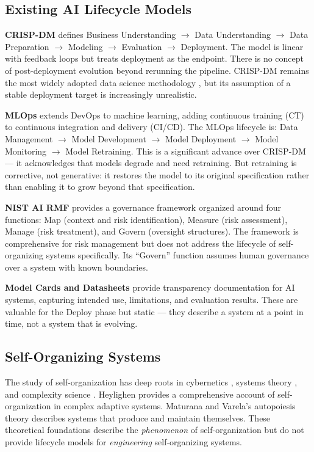 \documentclass[11pt,a4paper]{article}
\begin{document}
\subsection{Existing AI Lifecycle Models}

\textbf{CRISP-DM} \cite{wirth2000} defines Business Understanding $\rightarrow$ Data Understanding $\rightarrow$ Data Preparation $\rightarrow$ Modeling $\rightarrow$ Evaluation $\rightarrow$ Deployment. The model is linear with feedback loops but treats deployment as the endpoint. There is no concept of post-deployment evolution beyond rerunning the pipeline. CRISP-DM remains the most widely adopted data science methodology \cite{saltz2016}, but its assumption of a stable deployment target is increasingly unrealistic.

\textbf{MLOps} \cite{kreuzberger2023} extends DevOps to machine learning, adding continuous training (CT) to continuous integration and delivery (CI/CD). The MLOps lifecycle is: Data Management $\rightarrow$ Model Development $\rightarrow$ Model Deployment $\rightarrow$ Model Monitoring $\rightarrow$ Model Retraining. This is a significant advance over CRISP-DM --- it acknowledges that models degrade and need retraining. But retraining is corrective, not generative: it restores the model to its original specification rather than enabling it to grow beyond that specification.

\textbf{NIST AI RMF} \cite{nist2023} provides a governance framework organized around four functions: Map (context and risk identification), Measure (risk assessment), Manage (risk treatment), and Govern (oversight structures). The framework is comprehensive for risk management but does not address the lifecycle of self-organizing systems specifically. Its ``Govern'' function assumes human governance over a system with known boundaries.

\textbf{Model Cards and Datasheets} \cite{mitchell2019,gebru2021} provide transparency documentation for AI systems, capturing intended use, limitations, and evaluation results. These are valuable for the Deploy phase but static --- they describe a system at a point in time, not a system that is evolving.

\subsection{Self-Organizing Systems}

The study of self-organization has deep roots in cybernetics \cite{ashby1956}, systems theory \cite{vonbertalanffy1968}, and complexity science \cite{holland1995,kauffman1993}. Heylighen \cite{heylighen2001} provides a comprehensive account of self-organization in complex adaptive systems. Maturana and Varela's \cite{maturana1980} autopoiesis theory describes systems that produce and maintain themselves. These theoretical foundations describe the \emph{phenomenon} of self-organization but do not provide lifecycle models for \emph{engineering} self-organizing systems.
\end{document}
